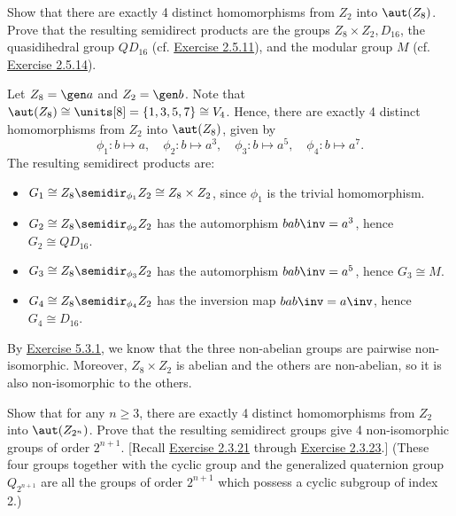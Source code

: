 \begin{exercise}\label{ex5.5.16}
    Show that there are exactly 4 distinct homomorphisms from $Z_2$ into $\aut(Z_8)$. Prove that the resulting semidirect products are the groups $Z_8 \times Z_2, D_{16}$, the quasidihedral group $QD_{16}$ (cf. \hyperref[ex2.5.11]{Exercise 2.5.11}), and the modular group $M$ (cf. \hyperref[ex2.5.14]{Exercise 2.5.14}). 
\end{exercise}

\begin{sol}
    Let $Z_8 = \gen a$ and $Z_2 = \gen b$. Note that $\aut(Z_8) \cong \units[8] = \{1, 3, 5, 7\} \cong V_4$. Hence, there are exactly 4 distinct homomorphisms from $Z_2$ into $\aut(Z_8)$, given by
    \[\phi_1 : b \mapsto a, \quad \phi_2 : b \mapsto a^3, \quad \phi_3 : b \mapsto a^5, \quad \phi_4 : b \mapsto a^7.\]
    The resulting semidirect products are:
    \begin{itemize}
        \item $G_1 \cong Z_8 \semidir_{\phi_1} Z_2 \cong Z_8 \times Z_2$, since $\phi_1$ is the trivial homomorphism.
        \item $G_2 \cong Z_8 \semidir_{\phi_2} Z_2$ has the automorphism $bab\inv = a^3$, hence $G_2 \cong QD_{16}$.
        \item $G_3 \cong Z_8 \semidir_{\phi_3} Z_2$ has the automorphism $bab\inv = a^5$, hence $G_3 \cong M$.
        \item $G_4 \cong Z_8 \semidir_{\phi_4} Z_2$ has the inversion map $bab\inv = a\inv$, hence $G_4 \cong D_{16}$.
    \end{itemize}
    By \hyperref[ex5.3.1]{Exercise 5.3.1}, we know that the three non-abelian groups are pairwise non-isomorphic. Moreover, $Z_8 \times Z_2$ is abelian and the others are non-abelian, so it is also non-isomorphic to the others.
\end{sol}

\begin{exercise}\label{ex5.5.17}
    Show that for any $n \geq 3$, there are exactly 4 distinct homomorphisms from $Z_2$ into $\aut(Z_{2^n})$. Prove that the resulting semidirect groups give 4 non-isomorphic groups of order $2^{n + 1}$. [Recall \hyperref[ex2.3.21]{Exercise 2.3.21} through \hyperref[ex2.3.23]{Exercise 2.3.23}.] (These four groups together with the cyclic group and the generalized quaternion group $Q_{2^{n + 1}}$ are all the groups of order $2^{n + 1}$ which possess a cyclic subgroup of index 2.)
\end{exercise}

